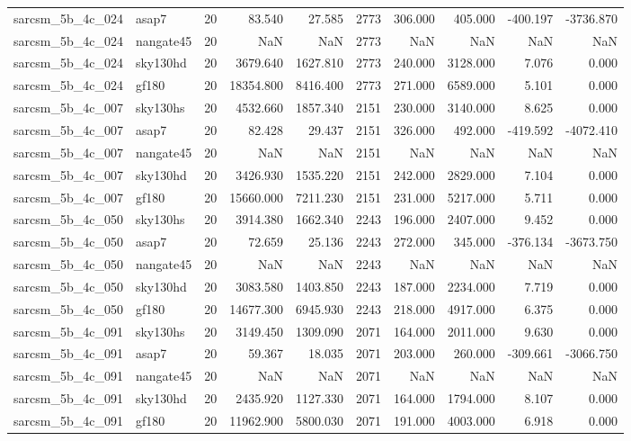 \begin{longtable}{llrrrrrrrr}
sarcsm\_5b\_4c\_024 & asap7 & 20 & 83.540 & 27.585 & 2773 & 306.000 & 405.000 & -400.197 & -3736.870 \\
sarcsm\_5b\_4c\_024 & nangate45 & 20 & NaN & NaN & 2773 & NaN & NaN & NaN & NaN \\
sarcsm\_5b\_4c\_024 & sky130hd & 20 & 3679.640 & 1627.810 & 2773 & 240.000 & 3128.000 & 7.076 & 0.000 \\
sarcsm\_5b\_4c\_024 & gf180 & 20 & 18354.800 & 8416.400 & 2773 & 271.000 & 6589.000 & 5.101 & 0.000 \\
sarcsm\_5b\_4c\_007 & sky130hs & 20 & 4532.660 & 1857.340 & 2151 & 230.000 & 3140.000 & 8.625 & 0.000 \\
sarcsm\_5b\_4c\_007 & asap7 & 20 & 82.428 & 29.437 & 2151 & 326.000 & 492.000 & -419.592 & -4072.410 \\
sarcsm\_5b\_4c\_007 & nangate45 & 20 & NaN & NaN & 2151 & NaN & NaN & NaN & NaN \\
sarcsm\_5b\_4c\_007 & sky130hd & 20 & 3426.930 & 1535.220 & 2151 & 242.000 & 2829.000 & 7.104 & 0.000 \\
sarcsm\_5b\_4c\_007 & gf180 & 20 & 15660.000 & 7211.230 & 2151 & 231.000 & 5217.000 & 5.711 & 0.000 \\
sarcsm\_5b\_4c\_050 & sky130hs & 20 & 3914.380 & 1662.340 & 2243 & 196.000 & 2407.000 & 9.452 & 0.000 \\
sarcsm\_5b\_4c\_050 & asap7 & 20 & 72.659 & 25.136 & 2243 & 272.000 & 345.000 & -376.134 & -3673.750 \\
sarcsm\_5b\_4c\_050 & nangate45 & 20 & NaN & NaN & 2243 & NaN & NaN & NaN & NaN \\
sarcsm\_5b\_4c\_050 & sky130hd & 20 & 3083.580 & 1403.850 & 2243 & 187.000 & 2234.000 & 7.719 & 0.000 \\
sarcsm\_5b\_4c\_050 & gf180 & 20 & 14677.300 & 6945.930 & 2243 & 218.000 & 4917.000 & 6.375 & 0.000 \\
sarcsm\_5b\_4c\_091 & sky130hs & 20 & 3149.450 & 1309.090 & 2071 & 164.000 & 2011.000 & 9.630 & 0.000 \\
sarcsm\_5b\_4c\_091 & asap7 & 20 & 59.367 & 18.035 & 2071 & 203.000 & 260.000 & -309.661 & -3066.750 \\
sarcsm\_5b\_4c\_091 & nangate45 & 20 & NaN & NaN & 2071 & NaN & NaN & NaN & NaN \\
sarcsm\_5b\_4c\_091 & sky130hd & 20 & 2435.920 & 1127.330 & 2071 & 164.000 & 1794.000 & 8.107 & 0.000 \\
sarcsm\_5b\_4c\_091 & gf180 & 20 & 11962.900 & 5800.030 & 2071 & 191.000 & 4003.000 & 6.918 & 0.000 \\

\end{longtable}
